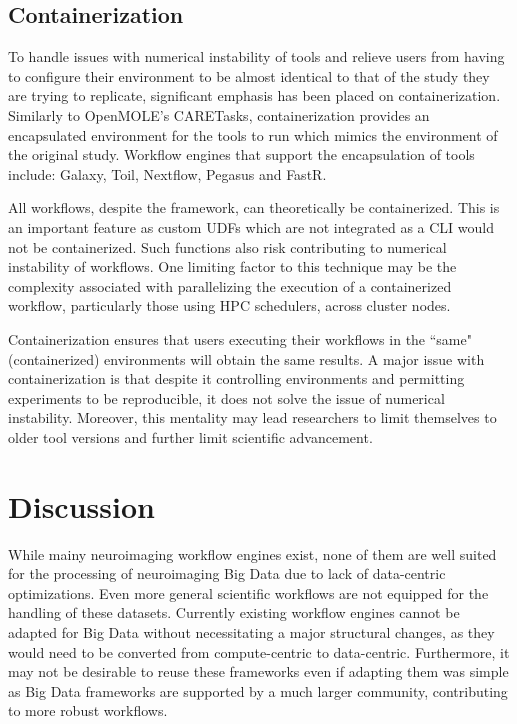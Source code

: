\documentclass{report}
\begin{document}
        \section{Containerization}\label{repcont}

            To handle issues with numerical instability of tools and relieve 
            users from
            having to configure their environment to be almost identical to 
            that of the study they are trying to replicate, significant 
            emphasis has been placed on containerization. Similarly to 
            OpenMOLE's CARETasks, containerization provides an encapsulated
            environment for the tools to run which mimics the environment of 
            the original study. Workflow engines that support the encapsulation of
            tools include: Galaxy, Toil, Nextflow, Pegasus and FastR. 

            All workflows, despite the framework, can theoretically be 
            containerized. This is an important feature as custom UDFs which 
            are not integrated as a CLI would not be containerized. Such 
            functions also risk contributing to numerical instability of 
            workflows. One limiting factor to this technique may be the complexity
            associated with parallelizing the execution of a containerized 
            workflow, particularly those using HPC schedulers, across cluster 
            nodes.  

            Containerization ensures that users executing their 
            workflows in the ``same" (containerized) environments will obtain the same results.
            A major issue with containerization is that despite it controlling
            environments and permitting experiments to be reproducible, it does
            not solve the issue of numerical instability. Moreover, this 
            mentality may lead researchers to limit themselves to older tool 
            versions and further limit scientific advancement.
    
    
    \chapter{Discussion}
    
        While mainy neuroimaging workflow engines exist, none of them are well
        suited for the processing of neuroimaging Big Data due to lack of data-centric optimizations. Even more general
        scientific workflows are not equipped for the handling of these datasets.
        Currently existing workflow engines cannot be adapted for Big Data without
        necessitating a major structural changes, as they would need to be converted
        from compute-centric to data-centric. Furthermore, it may not be desirable
        to reuse these frameworks even if adapting them was simple as Big Data 
        frameworks are supported by a much larger community, contributing to 
        more robust workflows.
\end{document}
